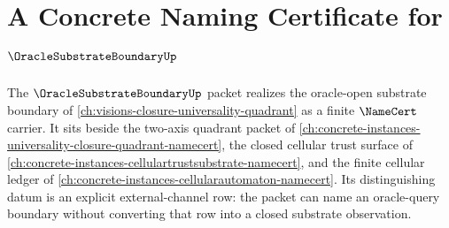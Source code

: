 \chapter{A Concrete Naming Certificate for $\OracleSubstrateBoundaryUp$}
\label{ch:concrete-instances-oracle-substrate-boundary-namecert}

The $\OracleSubstrateBoundaryUp$ packet realizes the oracle-open substrate boundary of \autoref{ch:visions-closure-universality-quadrant} as a finite $\NameCert$ carrier. It sits beside the two-axis quadrant packet of \autoref{ch:concrete-instances-universality-closure-quadrant-namecert}, the closed cellular trust surface of \autoref{ch:concrete-instances-cellulartrustsubstrate-namecert}, and the finite cellular ledger of \autoref{ch:concrete-instances-cellularautomaton-namecert}. Its distinguishing datum is an explicit external-channel row: the packet can name an oracle-query boundary without converting that row into a closed substrate observation.




